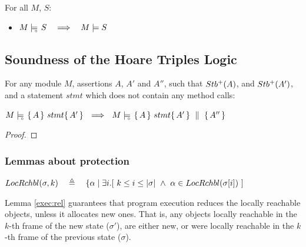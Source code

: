 { \begin{lemma}
For all $M$, $S$:
\begin{itemize}
\item
$\satisfiesD {M} {S}   \ \ \ \Longrightarrow \ \ \ \satisfies  {M} {S} $
\end{itemize}
\end{lemma}

\subsection{Soundness of the Hoare Triples Logic}
\label{s:sound:app:triples}

\begin{auxLemma}
\label{l:no:call}
For any module $M$, assertions $A$, $A'$ and $A''$, such that ${Stb^+( A )}$, and ${Stb^+( A' )}$, and a statement $stmt$ which does not contain any method calls:
\begin{center}
$  \satisfiesD {M} {\triple {A} {stmt} {A'} }  \ \ \Longrightarrow\ \  \satisfiesD {M} {\quadruple {A} {stmt} {A'} {A''}}$
\end{center}
\end{auxLemma}

\begin{proof}

\end{proof}


\subsubsection{Lemmas about protection}
\label{s:app:protect:lemmas}

\begin{definition}

$\LRelevantKO  {\sigma} {k}\ \ \ \triangleq\ \ \  \{ \alpha \mid  \exists i.[ \ k \leq i \leq \depth \sigma \ \wedge \ \alpha \in \LRelevantO  {\RestictTo \sigma i}\ ]$
\end{definition}
 
Lemma \ref{exec:rel} guarantees that  program execution reduces the locally reachable objects, unless it allocates new ones.
That is, any objects locally reachable in the $k$-th frame of the new state ($\sigma'$), are either new, or were locally reachable in the $k$-th frame of the previous state ($\sigma$).

}
